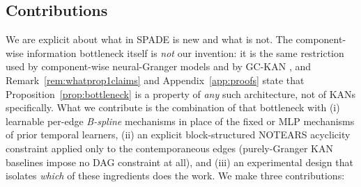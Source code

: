 \subsection{Contributions}
We are explicit about what in SPADE is new and what is not. The component-wise
information bottleneck itself is \emph{not} our invention: it is the same
restriction used by component-wise neural-Granger models
\citep{Tank2021,Shojaie2022} and by GC-KAN \citep{GCKAN2024}, and
Remark~\ref{rem:whatprop1claims} and Appendix~\ref{app:proofs} state that
Proposition~\ref{prop:bottleneck} is a property of \emph{any} such architecture,
not of KANs specifically. What we contribute is the combination of that
bottleneck with (i) learnable per-edge \emph{B-spline} mechanisms in place of the
fixed or MLP mechanisms of prior temporal learners, (ii) an explicit
block-structured NOTEARS acyclicity constraint applied only to the
contemporaneous edges (purely-Granger KAN baselines impose no DAG constraint at
all), and (iii) an experimental design that isolates \emph{which} of these
ingredients does the work. We make three contributions:

